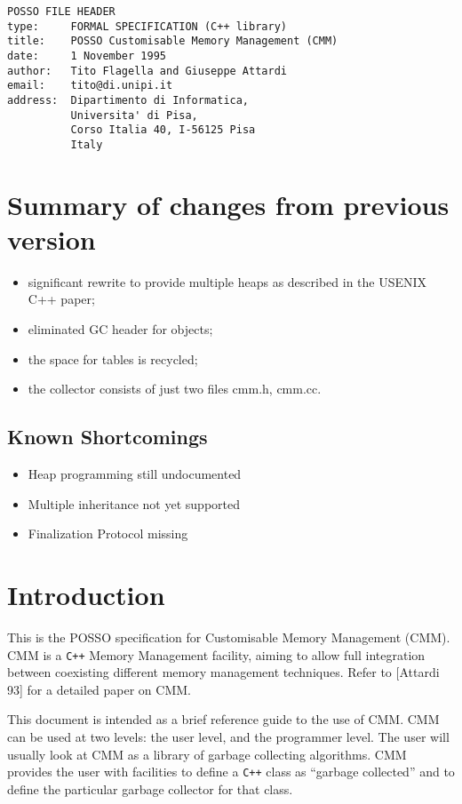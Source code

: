 \def\theenumi{\alph{enumi}}
\def\labelenumi{(\alph{enumi})}
\pagestyle{myheadings}

\begin{verbatim}
POSSO FILE HEADER
type:     FORMAL SPECIFICATION (C++ library)
title:    POSSO Customisable Memory Management (CMM)
date:     1 November 1995
author:   Tito Flagella and Giuseppe Attardi
email:    tito@di.unipi.it
address:  Dipartimento di Informatica,
          Universita' di Pisa,
          Corso Italia 40, I-56125 Pisa
          Italy
\end{verbatim}

\section{Summary of changes from previous version}
\begin{itemize}
\item significant rewrite to provide multiple heaps as described in the
USENIX C++ paper;
\item eliminated GC header for objects;
\item the space for tables is recycled;
\item the collector consists of just two files cmm.h, cmm.cc.
\end{itemize}

\subsection {Known Shortcomings}
\begin{itemize}
\item Heap programming still undocumented
\item Multiple inheritance not yet supported
\item Finalization Protocol missing
\end{itemize}

\section {Introduction}

This is the POSSO specification for Customisable Memory Management (CMM).
CMM is a {\tt C++} Memory Management facility, aiming to
allow full integration between coexisting different memory
management techniques.  Refer to [Attardi 93] for a detailed paper on CMM.

This document is intended as a brief reference guide to the use
of CMM.  CMM can be used at two levels: the user level, and the
programmer level.  The user will usually look at CMM as a library of
garbage collecting algorithms.  CMM provides the user with facilities to
define a {\tt C++} class as ``garbage collected'' and to define the 
particular garbage collector for that class.

